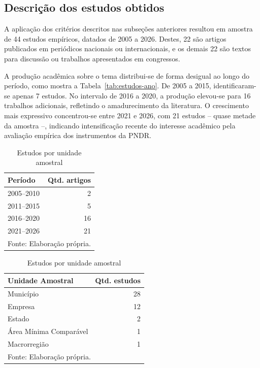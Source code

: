 \subsection{Descrição dos estudos obtidos}
\label{subsec:metodo-descricao-estudos}

A aplicação dos critérios descritos nas subseções anteriores resultou em amostra de 44 estudos empíricos, datados de 2005 a 2026. Destes, 22 são artigos publicados em periódicos nacionais ou internacionais, e os demais 22 são textos para discussão ou trabalhos apresentados em congressos.

A produção acadêmica sobre o tema distribui-se de forma desigual ao longo do período, como mostra a Tabela~\ref{tab:estudos-ano}. De 2005 a 2015, identificaram-se apenas 7 estudos. No intervalo de 2016 a 2020, a produção elevou-se para 16 trabalhos adicionais, refletindo o amadurecimento da literatura. O crescimento mais expressivo concentrou-se entre 2021 e 2026, com 21 estudos -- quase metade da amostra --, indicando intensificação recente do interesse acadêmico pela avaliação empírica dos instrumentos da PNDR.

\begin{table}[H]
\footnotesize
\renewcommand{\arraystretch}{1.2}
\centering
\begin{minipage}[t]{0.38\textwidth}
\centering
\caption{Estudos por período}
\label{tab:estudos-ano}
\begin{tabular}{lr}
\toprule
Período & Qtd. artigos \\
\midrule
2005--2010 & 2 \\
2011--2015 & 5 \\
2016--2020 & 16 \\
2021--2026 & 21 \\
\bottomrule
\multicolumn{2}{l}{\footnotesize Fonte: Elaboração própria.} \\
\end{tabular}
\end{minipage}
\hfill
\begin{minipage}[t]{0.58\textwidth}
\centering
\caption{Estudos por unidade amostral}
\label{tab:unidade-amostral}
\begin{tabular}{lr}
\toprule
Unidade Amostral & Qtd. estudos \\
\midrule
Município & 28 \\
Empresa & 12 \\
Estado & 2 \\
Área Mínima Comparável & 1 \\
Macrorregião & 1 \\
\bottomrule
\multicolumn{2}{l}{\footnotesize Fonte: Elaboração própria.} \\
\end{tabular}
\end{minipage}
\end{table}


